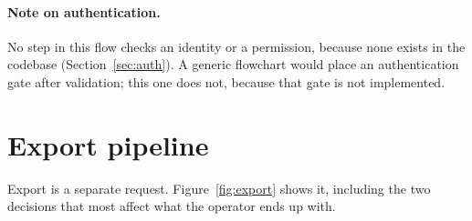 \documentclass[11pt,a4paper]{report}
\begin{document}
\paragraph{Note on authentication.} No step in this flow checks an identity or a
permission, because none exists in the codebase (Section~\ref{sec:auth}). A
generic flowchart would place an authentication gate after validation; this one
does not, because that gate is not implemented.

\section{Export pipeline}

Export is a separate request. Figure~\ref{fig:export} shows it, including the
two decisions that most affect what the operator ends up with.
\end{document}
